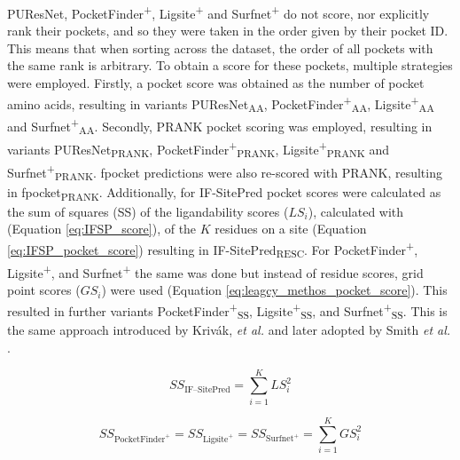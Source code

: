 PUResNet, PocketFinder\textsuperscript{+}, Ligsite\textsuperscript{+} and Surfnet\textsuperscript{+} do not score, nor explicitly rank their pockets, and so they were taken in the order given by their pocket ID. This means that when sorting across the dataset, the order of all pockets with the same rank is arbitrary. To obtain a score for these pockets, multiple strategies were employed. Firstly, a pocket score was obtained as the number of pocket amino acids, resulting in variants PUResNet\textsubscript{AA}, PocketFinder\textsuperscript{+}\textsubscript{AA}, Ligsite\textsuperscript{+}\textsubscript{AA} and Surfnet\textsuperscript{+}\textsubscript{AA}. Secondly, PRANK pocket scoring was employed, resulting in variants PUResNet\textsubscript{PRANK}, PocketFinder\textsuperscript{+}\textsubscript{PRANK}, Ligsite\textsuperscript{+}\textsubscript{PRANK} and Surfnet\textsuperscript{+}\textsubscript{PRANK}. fpocket predictions were also re-scored with PRANK, resulting in fpocket\textsubscript{PRANK}. Additionally, for IF-SitePred pocket scores were calculated as the sum of squares (SS) of the ligandability scores ($LS_{i}$), calculated with (Equation \ref{eq:IFSP_score}), of the $K$ residues on a site (Equation \ref{eq:IFSP_pocket_score}) resulting in IF-SitePred\textsubscript{RESC}. For PocketFinder\textsuperscript{+}, Ligsite\textsuperscript{+}, and Surfnet\textsuperscript{+} the same was done but instead of residue scores, grid point scores ($GS_{i}$) were used (Equation \ref{eq:leagcy_methos_pocket_score}). This resulted in further variants PocketFinder\textsuperscript{+}\textsubscript{SS}, Ligsite\textsuperscript{+}\textsubscript{SS}, and Surfnet\textsuperscript{+}\textsubscript{SS}. This is the same approach introduced by Krivák, \textit{et al.} \cite{KRIVAK_2015_P2RANK} and later adopted by Smith \textit{et al.} \cite{SMITH_2024_GrASP}.

\begin{equation}
SS_{\text{IF--SitePred}} = \sum_{i=1}^{K} LS_i^2
\label{eq:IFSP_pocket_score}
\end{equation}

\begin{equation}
SS_{\text{PocketFinder}^+} = SS_{\text{Ligsite}^+} = SS_{\text{Surfnet}^+} = \sum_{i=1}^{K} GS_i^2
\label{eq:leagcy_methos_pocket_score}
\end{equation}
